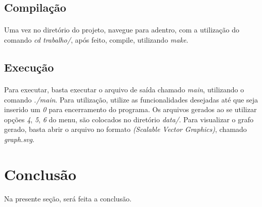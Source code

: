 \documentclass{article}
\begin{document}
        \subsection{Compilação}
            \paragraph{} Uma vez no diretório do projeto, navegue para adentro, com a utilização do comando {\it cd trabalho/}, após feito, compile, utilizando {\it make}.
        
        \subsection{Execução}
            \paragraph{} Para executar, basta executar o arquivo de saída chamado {\it main}, utilizando o comando {\it ./main}. Para utilização, utilize as funcionalidades desejadas até que seja inserido um {\it 0} para encerramento do programa. Os arquivos gerados ao se utilizar opções {\it 4}, {\it 5}, {\it 6} do menu, são colocados no diretório {\it data/}. Para visualizar o grafo gerado, basta abrir o arquivo no formato {\it (Scalable Vector Graphics)}, chamado {\it graph.svg}.
    \section{Conclusão}
        Na presente seção, será feita a conclusão.
\end{document}
